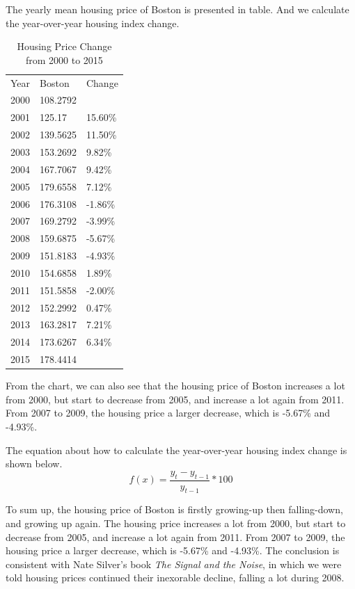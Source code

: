 \documentclass[t,ucs,12pt,xcolor=dvipsnames]{beamer}
\begin{document}
The yearly mean housing price of Boston is presented in table. And we calculate the year-over-year housing index change. 
\begin{table}[H]
\centering
\caption{Housing Price Change from 2000 to 2015}
\label{my-label}
\begin{tabular}{lll}
Year & Boston   & Change  \\
2000 & 108.2792 &         \\
2001 & 125.17   & 15.60\% \\
2002 & 139.5625 & 11.50\% \\
2003 & 153.2692 & 9.82\%  \\
2004 & 167.7067 & 9.42\%  \\
2005 & 179.6558 & 7.12\%  \\
2006 & 176.3108 & -1.86\% \\
2007 & 169.2792 & -3.99\% \\
2008 & 159.6875 & -5.67\% \\
2009 & 151.8183 & -4.93\% \\
2010 & 154.6858 & 1.89\%  \\
2011 & 151.5858 & -2.00\% \\
2012 & 152.2992 & 0.47\%  \\
2013 & 163.2817 & 7.21\%  \\
2014 & 173.6267 & 6.34\%  \\
2015 & 178.4414 &        
\end{tabular}
\end{table}

From the chart, we can also see that the housing price of Boston increases a lot from 2000, but start to decrease from 2005, and increase a lot again from 2011. From 2007 to 2009, the housing price a larger decrease, which is -5.67\% and -4.93\%.

The equation about how to calculate the year-over-year housing index change is shown below.
\[f\left ( x \right )= \frac{y_{t}-y_{t-1}}{y_{t-1}} * 100\]

To sum up, the housing price of Boston is firstly growing-up then falling-down, and growing up again. The housing price increases a lot from 2000, but start to decrease from 2005, and increase a lot again from 2011. From 2007 to 2009, the housing price a larger decrease, which is -5.67\% and -4.93\%. The conclusion is consistent with Nate Silver's book \textit{The Signal and the Noise}, in which we were told housing prices continued their inexorable decline, falling a lot during 2008.  
\end{document}
